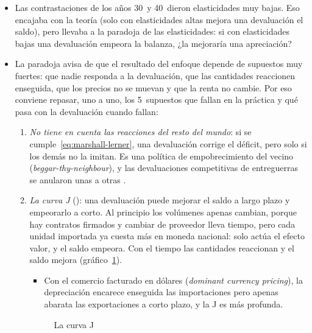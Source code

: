 \documentclass[11pt]{article}
\begin{document}
\begin{itemize}
\item Las contrastaciones de los años 30~y 40~dieron elasticidades muy bajas. Eso encajaba con la teoría (solo con elasticidades altas mejora una devaluación el saldo), pero llevaba a la paradoja de las elasticidades: si con elasticidades bajas una devaluación empeora la balanza, ¿la mejoraría una apreciación?
\item La paradoja avisa de que el resultado del enfoque depende de supuestos muy fuertes: que nadie responda a la devaluación, que las cantidades reaccionen enseguida, que los precios no se muevan y que la renta no cambie. Por eso conviene repasar, uno a uno, los 5~supuestos que fallan en la práctica y qué pasa con la devaluación cuando fallan:
  \begin{enumerate}
  \item \emph{No tiene en cuenta las reacciones del resto del mundo}: si se cumple~\eqref{eq:marshall-lerner}, una devaluación corrige el déficit, pero solo si los demás no la imitan. Es una política de empobrecimiento del vecino (\emph{beggar-thy-neighbour}), y las devaluaciones competitivas de entreguerras se anularon unas a otras .
  \item \emph{La curva J} (\textcite{Magee1973}): una devaluación puede mejorar el saldo a largo plazo y empeorarlo a corto. Al principio los volúmenes apenas cambian, porque hay contratos firmados y cambiar de proveedor lleva tiempo, pero cada unidad importada ya cuesta más en moneda nacional: solo actúa el efecto valor, y el saldo empeora. Con el tiempo las cantidades reaccionan y el saldo mejora (gráfico~\ref{fig:curva-j}).
    \begin{itemize}
    \item Con el comercio facturado en dólares (\emph{dominant currency pricing}), la depreciación encarece enseguida las importaciones pero apenas abarata las exportaciones a corto plazo, y la J es más profunda\nocite{Gopinath2020DCP}.
    \end{itemize}

\begin{figure}[H]
\centering
\caption{La curva J}\label{fig:curva-j}
\end{figure}


\end{enumerate}
\end{itemize}
\end{document}
